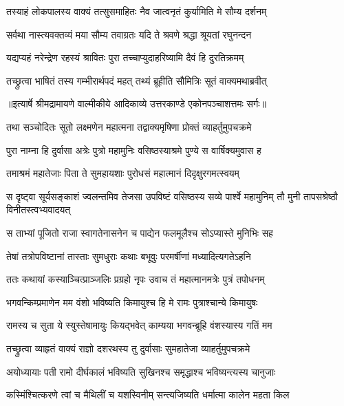 \twolineshloka
{तस्याहं लोकपालस्य वाक्यं तत्सुसमाहितः}
{नैव जात्वनृतं कुर्यामिति मे सौम्य दर्शनम्} %

\twolineshloka
{सर्वथा नास्त्यवक्तव्यं मया सौम्य तवाग्रतः}
{यदि ते श्रवणे श्रद्धा श्रूयतां रघुनन्दन} %

\twolineshloka
{यद्यप्यहं नरेन्द्रेण रहस्यं श्रावितः पुरा}
{तच्चाप्युदाहरिष्यामि दैवं हि दुरतिक्रमम्} %

\twolineshloka
{तच्छ्रुत्वा भाषितं तस्य गम्भीरार्थपदं महत्}
{तथ्यं ब्रूहीति सौमित्रिः सूतं वाक्यमथाब्रवीत्} %


{॥इत्यार्षे श्रीमद्रामायणे वाल्मीकीये आदिकाव्ये उत्तरकाण्डे एकोनपञ्चाशत्तमः सर्गः॥}


\twolineshloka
{तथा सञ्चोदितः सूतो लक्ष्मणेन महात्मना}
{तद्वाक्यमृषिणा प्रोक्तं व्याहर्तुमुपचक्रमे} %

\twolineshloka
{पुरा नाम्ना हि दुर्वासा अत्रेः पुत्रो महामुनिः}
{वसिष्ठस्याश्रमे पुण्ये स वार्षिक्यमुवास ह} %

\twolineshloka
{तमाश्रमं महातेजाः पिता ते सुमहायशाः}
{पुरोधसं महात्मानं दिदृक्षुरगमत्स्वयम्} %

\threelineshloka
{स दृष्ट्वा सूर्यसङ्काशं ज्वलन्तमिव तेजसा}
{उपविष्टं वसिष्ठस्य सव्ये पार्श्वे महामुनिम्}
{तौ मुनी तापसश्रेष्ठौ विनीतस्त्वभ्यवादयत्} %

\twolineshloka
{स ताभ्यां पूजितो राजा स्वागतेनासनेन च}
{पाद्येन फलमूलैश्च सोऽप्यास्ते मुनिभिः सह} %

\twolineshloka
{तेषां तत्रोपविष्टानां तास्ताः सुमधुराः कथाः}
{बभूवुः परमर्षीणां मध्यादित्यगतेऽहनि} %

\twolineshloka
{ततः कथायां कस्याञ्चित्प्राञ्जलिः प्रग्रहो नृपः}
{उवाच तं महात्मानमत्रेः पुत्रं तपोधनम्} %

\twolineshloka
{भगवन्किम्प्रमाणेन मम वंशो भविष्यति}
{किमायुश्च हि मे रामः पुत्राश्चान्ये किमायुषः} %

\twolineshloka
{रामस्य च सुता ये स्युस्तेषामायुः कियद्भवेत्}
{काम्यया भगवन्ब्रूहि वंशस्यास्य गतिं मम} %

\twolineshloka
{तच्छ्रुत्वा व्याहृतं वाक्यं राज्ञो दशरथस्य तु}
{दुर्वासाः सुमहातेजा व्याहर्तुमुपचक्रमे} %

\twolineshloka
{अयोध्यायाः पती रामो दीर्घकालं भविष्यति}
{सुखिनश्च समृद्धाश्च भविष्यन्त्यस्य चानुजाः} %

\twolineshloka
{कस्मिंश्चित्करणे त्वां च मैथिलीं च यशस्विनीम्}
{सन्त्यजिष्यति धर्मात्मा कालेन महता किल} %

